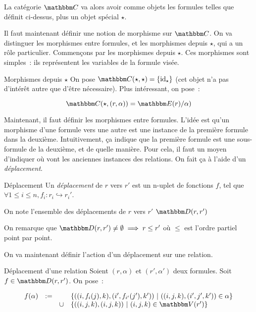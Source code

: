 La catégorie $\C$ va alors avoir comme objets les formules telles que définit ci-dessus,
plus un objet spécial $\star$.

Il faut maintenant définir une notion de morphisme sur $\C$. On va distinguer les
morphismes entre formules, et les morphismes depuis $\star$, qui a un rôle particulier.
Commençons par les morphismes depuis $\star$. Ces morphismes sont simples~: ils 
représentent les variables de la formule visée.

\begin{defi}{Morphismes depuis $\star$}
    On pose $\C(\star,\star) = \{\text{id}_\star\}$ (cet objet n'a pas d'intérêt autre
    que d'être nécessaire). Plus intéressant, on pose~:

    \[\C(\star, (r,\alpha)) = \E(r)/\alpha) \]
\end{defi}

Maintenant, il faut définir les morphismes entre formules. L'idée est qu'un morphisme
d'une formule vers une autre est une instance de la première formule dans la deuxième.
Intuitivement, ça indique que la première formule est une sous-formule de la deuxième,
et de quelle manière. Pour cela, il faut un moyen d'indiquer où vont les anciennes
instances des relations. On fait ça à l'aide d'un \emph{déplacement}.

\begin{defi}{Déplacement}
    Un \emph{déplacement} de $r$ vers $r'$ est un n-uplet de fonctions $f$, tel que
    $\forall 1\leq i\leq n, f_i : r_i\hookrightarrow r_i'$.

    On note l'ensemble des déplacements de $r$ vers $r'$ $\D(r,r')$
\end{defi}

\begin{rem}
    On remarque que $\D(r,r')\neq\emptyset\implies r\leq r'$ où $\leq$ est l'ordre
    partiel point par point.
\end{rem}

On va maintenant définir l'action d'un déplacement sur une relation.

\begin{defi}{Déplacement d'une relation}
    Soient $(r,\alpha)$ et $(r',\alpha')$ deux formules. Soit $f\in\D(r,r')$. On pose~:

    \[ \begin{array}{rccl}
          f(\alpha) &:= & & \{ ((i,f_i(j), k), (i', f_{i'}(j'), k'))
                              ~|~ ((i,j,k), (i',j',k'))\in \alpha \} \\
                    &   & \cup &\{ ((i,j,k), (i,j,k)) ~|~ (i,j,k)\in\V(r') \} \\
    \end{array} \]
\end{defi}

